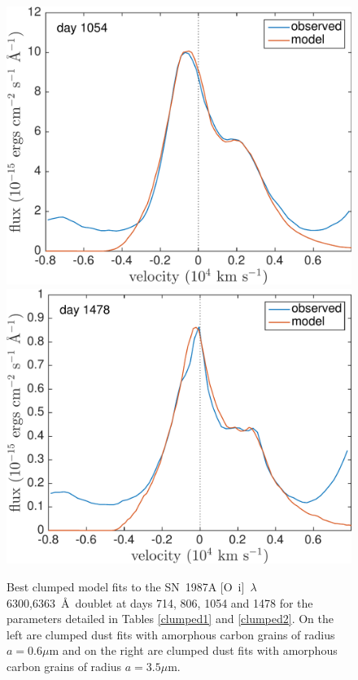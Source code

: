 \begin{figure}
\includegraphics[trim =0 25 0 0,clip=true,scale=0.4]{chapters/chapter5/images/clump_1/maximum/d1054OI.pdf}
\hspace{1mm}
\includegraphics[trim =25 25 0 0,clip=true,scale=0.4]{chapters/chapter5/images/clump_1/maximum/d1478OI_new.pdf}


\caption{Best clumped model fits to the SN~1987A [O~{\sc i}]~$\lambda$6300,6363~\AA\ doublet at days 714, 806, 1054 and 1478 for the parameters detailed in Tables \ref{clumped1} and \ref{clumped2}.  On the left are clumped dust fits with amorphous carbon grains of radius $a=0.6 \mu$m and on the right are clumped dust fits with amorphous carbon grains of radius $a=3.5 \mu$m.}
\label{OI_smooth}

\end{figure}

